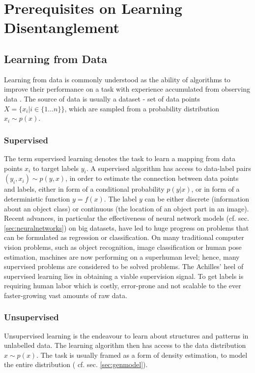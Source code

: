 \chapter{Prerequisites on Learning Disentanglement}

\section{Learning from Data}
	{Learning from data} is commonly understood as the ability of algorithms to improve their performance on a task with experience accumulated from observing data . The source of data is usually a dataset - set of data points $X = \{x_i | i \in \{1\ldots n\} \}$, which are sampled from a probability distribution $x_i \sim p(x)$.

	\subsection{Supervised}\label{sec:supervised}
		The term {supervised learning} denotes the task to learn a mapping from data points $x_i$ to target labels $y_i$.
		A supervised algorithm has access to data-label pairs  $(y_i, x_i) \sim p(y, x)$, in order to estimate the connection between data points and labels, either in form of a conditional probability $p(y|x)$, or in form of a deterministic function $y = f(x)$.
		The label $y$ can be either discrete (\eg information about an object class) or continuous (\eg the location of an object part in an image).
		Recent advances, in particular the effectiveness of neural network models (cf. sec. \ref{sec:neuralnetworks}) on big datasets, have led to huge progress on problems that can be formulated as regression or classification. On many traditional computer vision problems, such as \eg object recognition, image classification or human pose estimation, machines are now performing on a superhuman level; hence, many supervised problems are considered to be solved problems.
		The Achilles' heel of supervised learning lies in obtaining a viable supervision signal. To get labels is requiring human labor which is costly, error-prone and not scalable to the ever faster-growing vast amounts of raw data.

	\subsection{Unsupervised}\label{sec:unsupervised}
		{Unsupervised learning} is the endeavour to learn about structures and patterns in unlabelled data. The learning algorithm then has access to the data distribution $x \sim p(x)$. The task is usually framed as a form of density estimation, to model the entire distribution ( cf. sec. \ref{sec:genmodel}).

